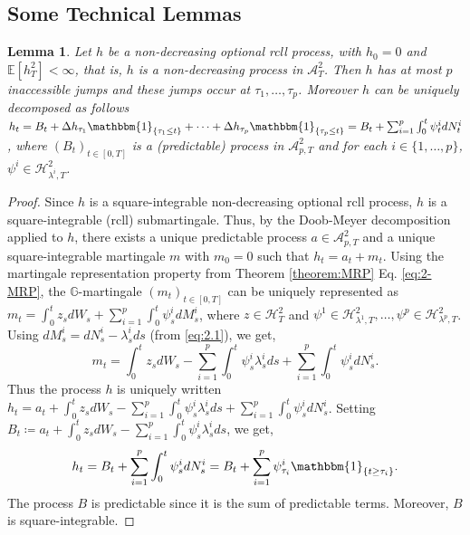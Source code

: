 \documentclass[11pt,a4paper]{article}
\numberwithin{equation}{section}
\theoremstyle{newPlain}
\newtheorem{lemma}[theorem]{Lemma}
\theoremstyle{newDefinition}
\theoremstyle{newRemark}
\begin{document}
\newpage


\begin{appendices}

\section{Some Technical Lemmas}\label{secA1}

\begin{lemma}\label{lemma:hDecomposition}
    Let $h$ be a non-decreasing optional rcll process, with $h_0=0$ and $\mathbb{E}[h_T^2]<\infty$, that is, $h$ is a non-decreasing process in $\mathcal{A}_T^2$. Then $h$ has at most $p$ inaccessible jumps and these jumps occur at $\tau_1,\ldots,\tau_p$. Moreover $h$ can be uniquely decomposed as follows $h_t = B_t + \Delta h_{\tau_1}\mathbbm{1}_{\{\tau_1\le t\}} + \cdots + \Delta h_{\tau_p}\mathbbm{1}_{\{\tau_p\le t\}} = B_t + \sum_{i=1}^p\int_0^t\psi_t^idN_t^i$, where $(B_t)_{t\in[0,T]}$ is a (predictable) process in $\mathcal{A}_{p,T}^2$ and for each $i\in\{1,\ldots,p\}$, $\psi^i\in\mathcal{H}_{\lambda^i,T}^2$.
\end{lemma}
\begin{proof}
    Since $h$ is a square-integrable non-decreasing optional rcll process, $h$ is a square-integrable (rcll) submartingale. Thus, by the Doob-Meyer decomposition applied to $h$, there exists a unique predictable process $a\in\mathcal{A}_{p,T}^2$ and a unique square-integrable martingale $m$ with $m_0=0$ such that $h_t = a_t + m_t$. Using the martingale representation property from Theorem \ref{theorem:MRP} Eq. \eqref{eq:2-MRP}, the $\mathbb{G}$-martingale $(m_t)_{t\in[0,T]}$ can be uniquely represented as $m_t = \int_0^tz_sdW_s + \sum_{i=1}^p\int_0^t\psi_s^idM_s^i$, where $z\in\mathcal{H}_T^2$ and $\psi^1\in\mathcal{H}_{\lambda^1,T}^2,\ldots,\psi^p\in\mathcal{H}_{\lambda^p,T}^2$. Using $dM_s^i = dN_s^i - \lambda_s^ids$ (from \eqref{eq:2.1}), we get,
    \begin{equation*}
        m_t = \int_0^tz_sdW_s - \sum_{i=1}^p\int_0^t\psi_s^i\lambda_s^ids + \sum_{i=1}^p\int_0^t\psi_s^idN_s^i.
    \end{equation*}
    Thus the process $h$ is uniquely written $h_t = a_t + \int_0^tz_sdW_s - \sum_{i=1}^p\int_0^t\psi_s^i\lambda_s^ids + \sum_{i=1}^p\int_0^t\psi_s^idN_s^i$. Setting $B_t \coloneqq a_t + \int_0^tz_sdW_s - \sum_{i=1}^p\int_0^t\psi_s^i\lambda_s^ids$, we get,
    \begin{equation*}
        h_t = B_t + \sum_{i=1}^p\int_0^t\psi_s^idN_s^i = B_t + \sum_{i=1}^p\psi_{\tau_i}^i\mathbbm{1}_{\{t\ge\tau_i\}}.
    \end{equation*}
    The process $B$ is predictable since it is the sum of predictable terms. Moreover, $B$ is square-integrable.
    

\end{proof}
\end{appendices}
\end{document}
